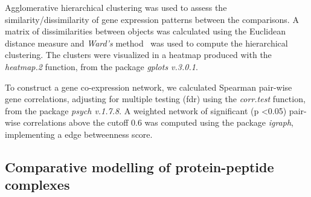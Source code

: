\documentclass[10pt,letterpaper]{article}
\begin{document}
Agglomerative hierarchical clustering was used to assess the similarity/dissimilarity of gene expression patterns between the comparisons. A matrix of dissimilarities between objects was calculated using the Euclidean distance measure and \textit{Ward's} method~\cite{Murtagh2014} was used to compute the hierarchical clustering. The clusters were visualized in a heatmap produced with the \textit{heatmap.2} function, from the package \textit{gplots v.3.0.1}.

To construct a gene co-expression network, we calculated Spearman pair-wise gene correlations, adjusting for multiple testing (fdr) using the \textit{corr.test} function, from the package \textit{psych v.1.7.8}. A weighted network of significant (p \textless 0.05) pair-wise correlations above the cutoff 0.6 was computed using the package \textit{igraph}, implementing a edge betweenness score.


\subsection*{Comparative modelling of protein-peptide complexes}
\end{document}
